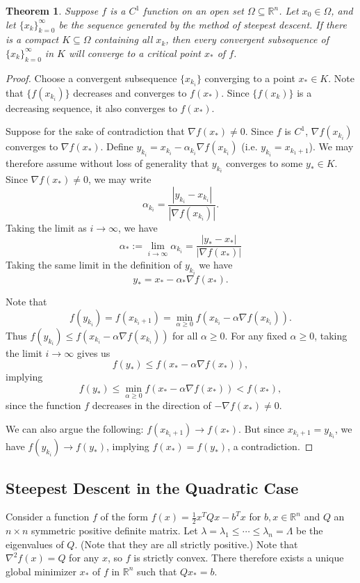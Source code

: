 \documentclass[11pt]{article}
\newcommand{\R}{\mathbb{R}}
\newtheorem{theorem}{Theorem}[subsection]
\begin{document}
\begin{theorem}
Suppose $f$ is a $C^1$ function on an open set $\Omega \subseteq \R^n$. Let $x_0 \in \Omega$, and let $\{x_k\}_{k=0}^\infty$ be the sequence generated by the method of steepest descent. If there is a compact $K \subseteq \Omega$ containing all $x_k$, then every convergent subsequence of $\{x_k\}_{k=0}^\infty$ in $K$ will converge to a critical point $x_*$ of $f$.
\end{theorem}
\begin{proof}
Choose a convergent subsequence $\{x_{k_i}\}$ converging to a point $x_* \in K$.  Note that $\{ f(x_{k_i}) \}$ decreases and converges to $f(x_*)$. Since $\{f(x_k)\}$ is a decreasing sequence, it also converges to $f(x_*)$.

Suppose for the sake of contradiction that $\nabla f(x_*) \neq 0$. Since $f$ is $C^1$, $\nabla f(x_{k_i})$ converges to $\nabla f(x_*)$. Define $y_{k_i} = x_{k_i} - \alpha_{k_i} \nabla f(x_{k_i})$ (i.e. $y_{k_i} = x_{k_1+1}$). We may therefore assume without loss of generality that $y_{k_i}$ converges to some $y_* \in K$. Since $\nabla f(x_*) \neq 0$, we may write
\[
\alpha_{k_i} = \frac{|y_{k_i} - x_{k_i}|}{|\nabla f(x_{k_i})|}.
\]
Taking the limit as $i \to \infty$, we have
\[
\alpha_* := \lim_{i \to \infty} \alpha_{k_i} = \frac{|y_* - x_*|}{|\nabla f(x_*)|}
\]
Taking the same limit in the definition of $y_{k_i}$ we have
\[
y_* = x_* - \alpha_* \nabla f(x_*).
\]

Note that
\[
f(y_{k_i}) = f(x_{k_i+1}) = \min_{\alpha \geq 0} f(x_{k_i} - \alpha \nabla f(x_{k_i})).
\]
Thus $f(y_{k_i}) \leq f(x_{k_i} - \alpha \nabla f(x_{k_i}))$ for all $\alpha \geq 0$. For any fixed $\alpha \geq 0$, taking the limit $i \to \infty$ gives us
\[
f(y_*) \leq f(x_* - \alpha \nabla f(x_*)),
\]
implying
\[
f(y_*) \leq \min_{\alpha \geq 0} f(x_* - \alpha \nabla f(x_*)) < f(x_*),
\]
since the function $f$ decreases in the direction of $-\nabla f(x_*) \neq 0$.

We can also argue the following: $f(x_{k_i+1}) \to f(x_*)$. But since $x_{k_i+1} = y_{k_i}$, we have $f(y_{k_i}) \to f(y_*)$, implying $f(x_*) = f(y_*)$, a contradiction.
\end{proof}

\subsection{Steepest Descent in the Quadratic Case}

Consider a function $f$ of the form $f(x) = \frac{1}{2}x^TQx - b^Tx$ for $b,x \in \R^n$ and $Q$ an $n \times n$ symmetric positive definite matrix. Let $\lambda = \lambda_1 \leq \cdots \leq \lambda_n = \Lambda$ be the eigenvalues of $Q$. (Note that they are all strictly positive.) Note that $\nabla^2 f(x) = Q$ for any $x$, so $f$ is strictly convex. There therefore exists a unique global minimizer $x_*$ of $f$ in $\R^n$ such that $Qx_* = b$. 
\end{document}
